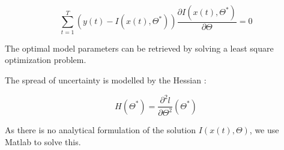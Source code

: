 \documentclass[11pt, a4paper]{article}
\begin{document}
\begin{equation}
\sum_{t=1}^T (y(t) - I(x(t), \Theta^*)) \frac{\partial I(x(t), \Theta^*)}{\partial \Theta} = 0
\end{equation}

The optimal model parameters can be retrieved by solving a least square optimization problem. 

The spread of uncertainty is modelled by the Hessian :

\begin{equation}
H(\Theta^*) = \frac{\partial^2 l}{\partial \Theta^2} (\Theta^*) 
\end{equation}

As there is no analytical formulation of the solution $I(x(t), \Theta)$, we use Matlab to solve this.







\end{document}
